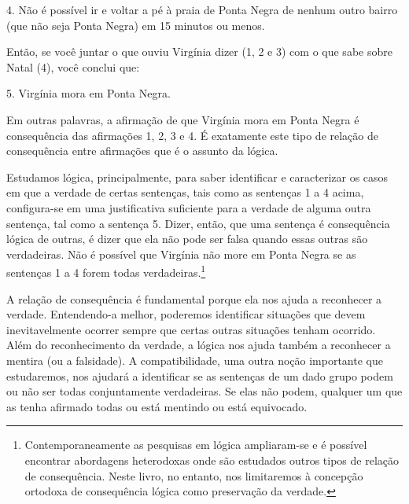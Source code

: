 \begin{earg}
	\item[4.] Não é possível ir e voltar a pé à praia de Ponta Negra de nenhum outro bairro (que não seja Ponta Negra) em 15 minutos ou menos.
\end{earg}
Então, se você juntar o que ouviu Virgínia dizer (1, 2 e 3) com o que sabe sobre Natal (4), você conclui que:
\begin{earg}
	\item[5.]  Virgínia mora em Ponta Negra.
\end{earg}
Em outras palavras, a afirmação de que Virgínia mora em Ponta Negra é consequência das afirmações 1, 2, 3 e 4.
É exatamente este tipo de relação de consequência entre afirmações que é o assunto da lógica.

Estudamos lógica, principalmente, para saber identificar e caracterizar os casos em que a verdade de certas sentenças, tais como as sentenças 1 a 4 acima, configura-se em uma justificativa suficiente para a verdade de alguma outra sentença, tal como a sentença 5.
Dizer, então, que uma sentença é consequência lógica de outras, é dizer que ela não pode ser falsa quando essas outras são verdadeiras.
Não é possível que Virgínia não more em Ponta Negra se as sentenças 1 a 4 forem todas verdadeiras.\footnote{
	Contemporaneamente as pesquisas em lógica ampliaram-se e é possível encontrar abordagens heterodoxas onde são estudados outros tipos de relação de consequência.
	Neste livro, no entanto, nos limitaremos à concepção ortodoxa de consequência lógica como preservação da verdade.}

A relação de consequência é fundamental porque ela nos ajuda a reconhecer a verdade.
Entendendo-a melhor, poderemos identificar situações que devem  inevitavelmente ocorrer sempre que certas outras situações tenham ocorrido.
Além do reconhecimento da verdade, a lógica nos ajuda também a reconhecer a mentira (ou a falsidade).
A compatibilidade, uma outra noção importante que estudaremos, nos ajudará a identificar se as sentenças de um dado grupo podem ou não ser todas conjuntamente verdadeiras.
Se elas não podem, qualquer um que as tenha afirmado todas ou está mentindo ou está equivocado.



